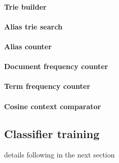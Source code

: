\paragraph{Trie builder}
\paragraph{Alias trie search}
\paragraph{Alias counter}
\paragraph{Document frequency counter}
\paragraph{Term frequency counter}
\paragraph{Cosine context comparator}

\subsection{Classifier training}
details following in the next section